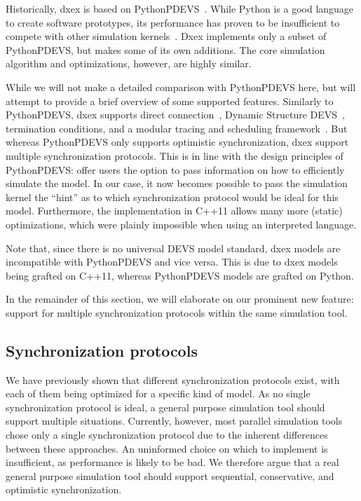 Historically, dxex is based on PythonPDEVS~\cite{PythonPDEVS}.
While Python is a good language to create software prototypes, its performance has proven to be insufficient to compete with other simulation kernels~\cite{MasterThesis}.
Dxex implements only a subset of PythonPDEVS, but makes some of its own additions.
The core simulation algorithm and optimizations, however, are highly similar.

While we will not make a detailed comparison with PythonPDEVS here, but will attempt to provide a brief overview of some supported features.
Similarly to PythonPDEVS, dxex supports direct connection~\cite{SymbolicFlattening}, \textsf{Dynamic Structure DEVS}~\cite{DSDEVS}, termination conditions, and a modular tracing and scheduling framework~\cite{PythonPDEVS}.
But whereas PythonPDEVS only supports optimistic synchronization, dxex support multiple synchronization protocols.
This is in line with the design principles of PythonPDEVS: offer users the option to pass information on how to efficiently simulate the model.
In our case, it now becomes possible to pass the simulation kernel the ``hint'' as to which synchronization protocol would be ideal for this model.
Furthermore, the implementation in C++11 allows many more (static) optimizations, which were plainly impossible when using an interpreted language.

Note that, since there is no universal \textsf{DEVS} model standard, dxex models are incompatible with PythonPDEVS and vice versa.
This is due to dxex models being grafted on C++11, whereas PythonPDEVS models are grafted on Python.

In the remainder of this section, we will elaborate on our prominent new feature: support for multiple synchronization protocols within the same simulation tool.

\subsection{Synchronization protocols}
We have previously shown that different synchronization protocols exist, with each of them being optimized for a specific kind of model.
As no single synchronization protocol is ideal, a general purpose simulation tool should support multiple situations.
Currently, however, most parallel simulation tools chose only a single synchronization protocol due to the inherent differences between these approaches.
An uninformed choice on which to implement is insufficient, as performance is likely to be bad.
We therefore argue that a real general purpose simulation tool should support sequential, conservative, and optimistic synchronization.


